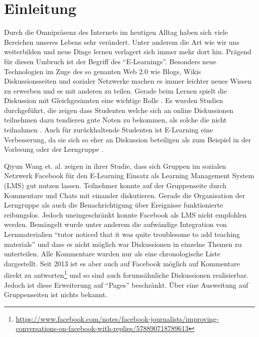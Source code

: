 
\chapter{Einleitung} %
\label{cha:einleitung}





Durch die Omnipräsenz des Internets im heutigen Alltag haben sich viele Bereichen unseres Lebens sehr verändert. Unter anderem die Art wie wir uns weiterbilden und neue Dinge lernen verlagert sich immer mehr dort hin. Prägend für diesen Umbruch ist der Begriff des \enquote{E-Learnings}. Besonders neue Technologien im Zuge des so genanten Web 2.0 wie Blogs, Wikis Diskussionsseiten und sozialer Netzwerke machen es immer leichter neues Wissen zu erwerben und es mit anderen zu teilen. Gerade beim Lernen spielt die Diskussion mit Gleichgesinnten eine wichtige Rolle \cite{Downes2005}. Es wurden Studien durchgeführt, die zeigen dass Studenten welche sich an online Diskussionen teilnehmen dazu tendieren gute Noten zu bekommen, als solche die nicht teilnahmen \cite{Davies2005,BJET:BJET780}. Auch für zurückhaltende Studenten ist E-Learning eine Verbesserung, da sie sich so eher an Diskussion beteiligen als zum Beispiel in der Vorlesung oder der Lerngruppe \cite{Huang:2009:EPF:1516241.1516267}. 

\medskip

Qiyun Wang et. al. \cite{Wang2012} zeigen in ihrer Studie, dass sich Gruppen im sozialen Netzwerk Facebook für den E-Learning Einsatz als Learning Management System (LMS) gut nutzen lassen. Teilnehmer konnte auf der Gruppenseite durch Kommentare und Chats mit einander diskutieren. Gerade die Organisation der Lerngruppe als auch die Benachrichtigung über Ereignisse funktionierte reibungslos. Jedoch uneingeschränkt konnte Facebook als LMS nicht empfohlen werden. Bemängelt wurde unter anderem die aufwändige Integration von Lernmaterialien \enquote{tutor noticed that it was quite troublesome to add teaching materials}\cite[S.\,435]{Wang2012} und dass es nicht möglich war Diskussionen in einzelne Themen zu unterteilen. Alle Kommentare wurden nur als eine chronologische Liste dargestellt. Seit 2013 ist es aber auch auf Facebook möglich auf Kommentare direkt zu antworten\footnote{\url{https://www.facebook.com/notes/facebook-journalists/improving-conversations-on-facebook-with-replies/578890718789613}} und so sind auch forumsähnliche Diskussionen realisierbar. Jedoch ist diese Erweiterung auf \enquote{Pages} beschränkt. Über eine Ausweitung auf Gruppenseiten ist nichts bekannt. 

